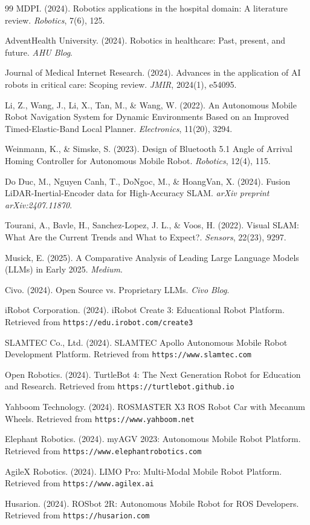 \begin{thebibliography}{99}
MDPI. (2024). Robotics applications in the hospital domain: A literature review. \textit{Robotics}, 7(6), 125.

AdventHealth University. (2024). Robotics in healthcare: Past, present, and future. \textit{AHU Blog}.

Journal of Medical Internet Research. (2024). Advances in the application of AI robots in critical care: Scoping review. \textit{JMIR}, 2024(1), e54095.

Li, Z., Wang, J., Li, X., Tan, M., \& Wang, W. (2022). An Autonomous Mobile Robot Navigation System for Dynamic Environments Based on an Improved Timed-Elastic-Band Local Planner. \textit{Electronics}, 11(20), 3294.

Weinmann, K., \& Simske, S. (2023). Design of Bluetooth 5.1 Angle of Arrival Homing Controller for Autonomous Mobile Robot. \textit{Robotics}, 12(4), 115.

Do Duc, M., Nguyen Canh, T., DoNgoc, M., \& HoangVan, X. (2024). Fusion LiDAR-Inertial-Encoder data for High-Accuracy SLAM. \textit{arXiv preprint arXiv:2407.11870}.

Tourani, A., Bavle, H., Sanchez-Lopez, J. L., \& Voos, H. (2022). Visual SLAM: What Are the Current Trends and What to Expect?. \textit{Sensors}, 22(23), 9297.

Musick, E. (2025). A Comparative Analysis of Leading Large Language Models (LLMs) in Early 2025. \textit{Medium}.

Civo. (2024). Open Source vs. Proprietary LLMs. \textit{Civo Blog}.

iRobot Corporation. (2024). iRobot Create 3: Educational Robot Platform. Retrieved from \texttt{https://edu.irobot.com/create3}

SLAMTEC Co., Ltd. (2024). SLAMTEC Apollo Autonomous Mobile Robot Development Platform. Retrieved from \texttt{https://www.slamtec.com}

Open Robotics. (2024). TurtleBot 4: The Next Generation Robot for Education and Research. Retrieved from \texttt{https://turtlebot.github.io}

Yahboom Technology. (2024). ROSMASTER X3 ROS Robot Car with Mecanum Wheels. Retrieved from \texttt{https://www.yahboom.net}

Elephant Robotics. (2024). myAGV 2023: Autonomous Mobile Robot Platform. Retrieved from \texttt{https://www.elephantrobotics.com}

AgileX Robotics. (2024). LIMO Pro: Multi-Modal Mobile Robot Platform. Retrieved from \texttt{https://www.agilex.ai}

Husarion. (2024). ROSbot 2R: Autonomous Mobile Robot for ROS Developers. Retrieved from \texttt{https://husarion.com}

\end{thebibliography}